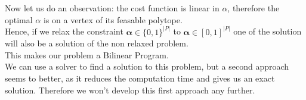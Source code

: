 Now let us do an observation: the cost function is linear in $\alpha$, therefore the optimal $\alpha$ is on a vertex of its feasable polytope.\\
Hence, if we relax the constraint $\mathbf{\alpha} \in \{0,1\}^{|P|}$ to $\mathbf{\alpha} \in [0,1]^{|P|}$ one of the solution will also be a solution of the non relaxed problem.
\\
This makes our problem a Bilinear Program.\\
We can use a solver to find a solution to this problem, but a second approach seems to better, as it reduces the computation time and gives us an exact solution. Therefore we won't develop this first approach any further.